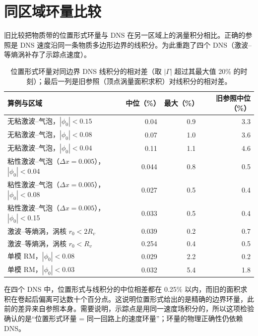 \section{同区域环量比较}
旧比较把物质带的位置形式环量与 DNS 在另一区域上的涡量积分相比。正确的参照是 DNS 速度沿同一条物质多边形边界的线积分。为此重跑了四个 DNS（激波–等熵涡补存了示踪点速度）。
\begin{table}[!htbp]\centering\small\caption{位置形式环量对同边界 DNS 线积分的相对差（取 $|\Gamma|$ 超过其最大值 20\% 的时刻）；最后一列是旧参照（顶点涡量面积求积）对线积分的相对差。}\label{v2:tab:circ}
\begin{tabularx}{\linewidth}{@{}L r r r@{}}\toprule
算例与区域 & 中位（\%） & 最大（\%） & 旧参照中位（\%）\\\midrule
无粘激波–气泡，$|\phi_0|<0.15$ & 0.04 & 0.9 & 3.3\\
无粘激波–气泡，$|\phi_0|<0.08$ & 0.07 & 1.0 & 3.6\\
无粘激波–气泡，$|\phi_0|<0.04$ & 0.11 & 1.1 & 4.6\\
粘性激波–气泡（$\Delta x=0.005$），$|\phi_0|<$0.04 & 0.044 & 0.8 & 0.5\\
粘性激波–气泡（$\Delta x=0.005$），$|\phi_0|<$0.08 & 0.027 & 0.5 & 0.4\\
粘性激波–气泡（$\Delta x=0.005$），$|\phi_0|<$0.15 & 0.033 & 0.5 & 0.4\\
激波–等熵涡，涡核 $r_0<2R_v$ & 0.039 & 0.2 & 0.7\\
激波–等熵涡，涡核 $r_0<R_v$ & 0.254 & 0.4 & 0.5\\
单模 RM，$|\phi_0|<$0.08 & 0.029 & 2.2 & 0.2\\
单模 RM，$|\phi_0|<$0.03 & 0.032 & 5.4 & 1.8\\
\bottomrule\end{tabularx}\end{table}
在四个 DNS 中，位置形式与线积分的中位相差都在 0.25\% 以内，而旧的面积求积在卷起后偏离可达数十个百分点。这说明位置形式给出的是精确的边界环量，此前的差异来自参照本身。需要说明，示踪点是用同一速度场积分的，所以这项检验确认的是“位置形式环量 = 同一回路上的速度环量”；环量的物理正确性仍依赖 DNS。

